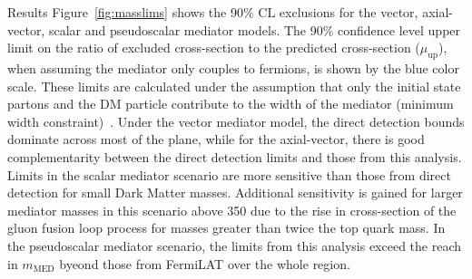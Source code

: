 \begin{section}{Results}
Figure~\ref{fig:masslims} shows the 90\% CL exclusions for the vector, axial-vector, 
scalar and pseudoscalar mediator models.  The 90\% confidence level upper limit on the ratio of excluded cross-section to the predicted cross-section ($\mu_{\textrm{up}}$), 
when assuming the mediator only couples to fermions, is shown by the blue color scale. These limits are calculated under the assumption 
that only the initial state partons and the DM 
particle contribute to the width of the mediator (minimum width constraint)~\cite{An:2012va,Abercrombie:2015wmb,Fox:2011pm,simplified1}. 
%
Under the vector mediator model, the direct detection bounds dominate across most of the plane, while for the axial-vector, there is good complementarity between the direct detection limits and 
those from this analysis. Limits in the scalar mediator scenario are
more sensitive than those from direct detection for small Dark Matter masses. Additional sensitivity is gained
for larger mediator masses in this scenario above 350 \GeV due to the
rise in cross-section of the gluon fusion loop process for masses
greater than twice the
top quark mass. In the pseudoscalar mediator scenario, the limits from this analysis exceed the reach in $m_{\mathrm{MED}}$ byeond those from FermiLAT over the whole region.


\end{section}
